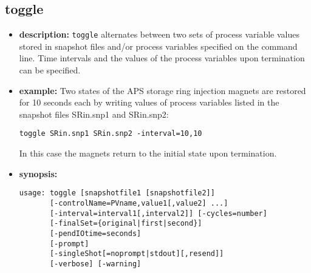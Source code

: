 %
%
\begin{latexonly}
\newpage
\end{latexonly}

%
%
\subsection{toggle}
\label{toggle}

\begin{itemize}
\item {\bf description:}
%
%
\verb+toggle+ alternates between two sets of process variable values stored in 
snapshot files and/or
process variables specified on the command line.
Time intervals and the values of the process variables upon termination can be specified.
\item {\bf example:} 
%
% 
%
Two states of the APS storage ring injection magnets are restored for 10 seconds each by writing
values of process variables listed in the snapshot files SRin.snp1 and SRin.snp2:
\begin{verbatim}
toggle SRin.snp1 SRin.snp2 -interval=10,10
\end{verbatim}
In this case the magnets return to the initial state upon termination.

\item {\bf synopsis:} 
%
%
\begin{verbatim}
usage: toggle [snapshotfile1 [snapshotfile2]]
       [-controlName=PVname,value1[,value2] ...]
       [-interval=interval1[,interval2]] [-cycles=number]
       [-finalSet={original|first|second}]
       [-pendIOtime=seconds]
       [-prompt]
       [-singleShot[=noprompt|stdout][,resend]]
       [-verbose] [-warning]
\end{verbatim}


\end{itemize}
